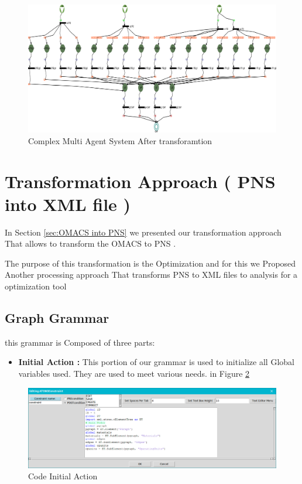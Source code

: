  \begin{landscape}
\begin{figure}[th]
	\centering 
 	\includegraphics[scale=1.3]{Chapiter3/img/articlePNS2}
	\caption{\label{fig:Complex Multi Agent System After transforamtion}Complex Multi Agent System After transforamtion}
\end{figure} 
 
 \end{landscape}


%
%
\section{Transformation Approach ( PNS into XML file ) }
In Section \ref{sec:OMACS into PNS} we presented our transformation approach That allows 
to transform the OMACS to PNS .

The purpose of this transformation is the Optimization and for this we
Proposed Another processing approach That transforms PNS to XML 
files to analysis for a optimization tool 
\subsection{ Graph Grammar }
 this grammar is Composed of three parts: 
\begin{itemize}
\item \textbf{Initial Action : } This portion of our grammar is used to initialize all
Global variables used. They are used to meet various needs.  in Figure \ref{fig:Code Initial Action} 

\end{itemize}

\begin{figure}[th]
	\centering  %
 	\includegraphics[scale=0.38]{Chapiter3/img/InitAct}
	\caption{\label{fig:Code Initial Action}Code Initial Action}
\end{figure} 

